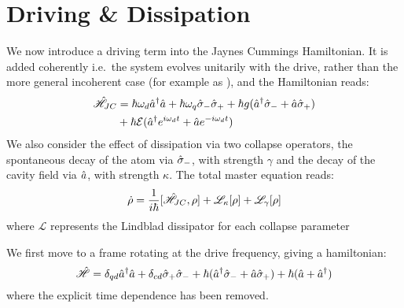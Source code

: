 
\section{Driving \& Dissipation}
We now introduce a driving term into the Jaynes Cummings Hamiltonian. It is added coherently i.e.\ the system evolves unitarily with the drive, rather than the more general incoherent case (for example as \cite{Xu2014}), and the Hamiltonian reads:
\begin{align}
        \hat{\mathscr{H}}_{JC} &= \hbar \omega_d \hat{a}^\dagger \hat{a} + \hbar \omega_q \hat{\sigma}_- \hat{\sigma}_+ +\hbar g (\hat{a}^\dagger \hat{\sigma}_-+ \hat{a} \hat{\sigma}_+)\\
                   & + \hbar \mathcal{E} (\hat{a}^\dagger e^{i\omega_d t} + \hat{a} e^{-i\omega_d t})
\end{align}
We also consider the effect of dissipation via two collapse operators, the spontaneous decay of the atom via $\hat{\sigma}_-$, with strength $\gamma$ and the decay of the cavity field via $\hat{a}$, with strength $\kappa$. The total master equation reads:
\begin{equation}
  \dot{\rho} = \frac{1}{i\hbar}[\hat{\mathscr{H}}_{JC}, \rho] + \mathscr{L}_\kappa[\rho] + \mathscr{L}_\gamma[\rho]
\end{equation}
where $\mathscr{L}$ represents the Lindblad dissipator for each collapse parameter

We first move to a frame rotating at the drive frequency, giving a hamiltonian:
\begin{equation}
  \hat{\mathscr{H}} = \delta_{qd} \hat{a}^\dagger \hat{a} + \delta_{cd} \hat{\sigma}_+ \hat{\sigma}_- + \hbar (\hat{a}^\dagger \hat{\sigma}_- + \hat{a} \hat{\sigma}_+) + \hbar (\hat{a} + \hat{a}^\dagger)
\end{equation}
where the explicit time dependence has been removed.

